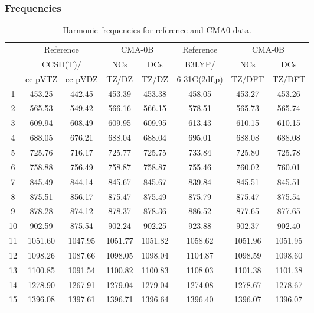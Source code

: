 \documentclass[10pt,oneside]{article}
\begin{document}
\clearpage

\subsubsection*{Frequencies}
\begin{table}[h!]
\centering
\caption{Harmonic frequencies for reference and CMA0 data.}
\begin{tabular}{cccccccc}
\toprule
{} & \multicolumn{2}{c}{Reference} & \multicolumn{2}{c}{CMA-0B} &    Reference & \multicolumn{2}{c}{CMA-0B} \\
{} & \multicolumn{2}{c}{CCSD(T)/} &     NCs &     DCs &       B3LYP/ &     NCs &     DCs \\
{} &   cc-pVTZ & cc-pVDZ &   TZ/DZ &   TZ/DZ & 6-31G(2df,p) &  TZ/DFT &  TZ/DFT \\
\midrule
1  &    453.25 &  442.45 &  453.39 &  453.38 &       458.05 &  453.27 &  453.26 \\
2  &    565.53 &  549.42 &  566.16 &  566.15 &       578.51 &  565.73 &  565.74 \\
3  &    609.94 &  608.49 &  609.95 &  609.95 &       613.43 &  610.15 &  610.15 \\
4  &    688.05 &  676.21 &  688.04 &  688.04 &       695.01 &  688.08 &  688.08 \\
5  &    725.76 &  716.17 &  725.77 &  725.75 &       733.84 &  725.80 &  725.78 \\
6  &    758.88 &  756.49 &  758.87 &  758.87 &       755.46 &  760.02 &  760.01 \\
7  &    845.49 &  844.14 &  845.67 &  845.67 &       839.84 &  845.51 &  845.51 \\
8  &    875.51 &  856.17 &  875.47 &  875.49 &       875.79 &  875.47 &  875.54 \\
9  &    878.28 &  874.12 &  878.37 &  878.36 &       886.52 &  877.65 &  877.65 \\
10 &    902.59 &  875.54 &  902.24 &  902.25 &       923.88 &  902.37 &  902.40 \\
11 &   1051.60 & 1047.95 & 1051.77 & 1051.82 &      1058.62 & 1051.96 & 1051.95 \\
12 &   1098.26 & 1087.66 & 1098.05 & 1098.04 &      1104.87 & 1098.59 & 1098.60 \\
13 &   1100.85 & 1091.54 & 1100.82 & 1100.83 &      1108.03 & 1101.38 & 1101.38 \\
14 &   1278.90 & 1267.91 & 1279.04 & 1279.04 &      1274.08 & 1278.67 & 1278.67 \\
15 &   1396.08 & 1397.61 & 1396.71 & 1396.64 &      1396.40 & 1396.07 & 1396.07 \\

\end{tabular}
\end{table}
\end{document}
